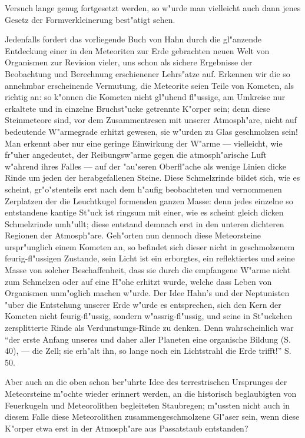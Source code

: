 \documentclass[a4paper, 11pt, oneside]{article}
\begin{document}
Versuch lange genug fortgesetzt werden, so w"urde man vielleicht auch dann jenes Gesetz der Formverkleinerung best"atigt sehen.

Jedenfalls fordert das vorliegende Buch von Hahn durch die gl"anzende Entdeckung einer in den Meteoriten zur Erde gebrachten neuen Welt von Organismen zur Revision vieler, uns schon als sichere Ergebnisse der Beobachtung und Berechnung erschienener Lehrs"atze auf. Erkennen wir die so annehmbar erscheinende Vermutung, die Meteorite seien Teile von Kometen, als richtig an: so k"onnen die Kometen nicht gl"uhend fl"ussige, am Umkreise nur erkaltete und in einzelne Bruchst"ucke getrennte K"orper sein; denn diese Steinmeteore sind, vor dem Zusammentresen mit unserer Atmosph"are, nicht auf bedeutende W"armegrade erhitzt gewesen, sie w"urden zu Glas geschmolzen sein! Man erkennt aber nur eine geringe Einwirkung der W"arme --- vielleicht, wie fr"uher angedeutet, der Reibungsw"arme gegen die atmosph"arische Luft w"ahrend ihres Falles --- auf der "au"seren Oberfl"ache als wenige Linien dicke Rinde um jeden der herabgefallenen Steine. Diese Schmelzrinde bildet sich, wie es scheint, gr"o"stenteils erst nach dem h"aufig beobachteten und vernommenen Zerplatzen der die Leuchtkugel formenden ganzen Masse: denn jedes einzelne so entstandene kantige St"uck ist ringsum mit einer, wie es scheint gleich dicken Schmelzrinde umh"ullt; diese entstand demnach erst in den unteren dichteren Regionen der Atmosph"are. Geh"orten nun dennoch diese Meteorsteine urspr"unglich einem Kometen an, so befindet sich dieser nicht in geschmolzenem feurig-fl"ussigen Zustande, sein Licht ist ein erborgtes, ein reflektiertes und seine Masse von solcher Beschaffenheit, dass sie durch die empfangene W"arme nicht zum Schmelzen oder auf eine H"ohe erhitzt wurde, welche dass Leben von Organismen unm"oglich machen w"urde. Der Idee Hahn's und der Neptunisten "uber die Entstehung unserer Erde w"urde es entsprechen, sich den Kern der Kometen nicht feurig-fl"ussig, sondern w"assrig-fl"ussig, und seine in St"uckchen zersplitterte Rinde als Verdunstungs-Rinde zu denken. Denn wahrscheinlich war "`der erste Anfang unseres und daher aller Planeten eine organische Bildung (S. 40), --- die Zell; sie erh"alt ihn, so lange noch ein Lichtstrahl die Erde trifft!"' S. 50.

Aber auch an die oben schon ber"uhrte Idee des terrestrischen Ursprunges der Meteorsteine m"ochte wieder erinnert werden, an die historisch beglaubigten von Feuerkugeln und Meteorolithen begleiteten Staubregen; m"ussten nicht auch in diesem Falle diese Meteorolithen zusammengeschmolzene Gl"aser sein, wenn diese K"orper etwa erst in der Atmosph"are aus Passatstaub entstanden?
\end{document}
